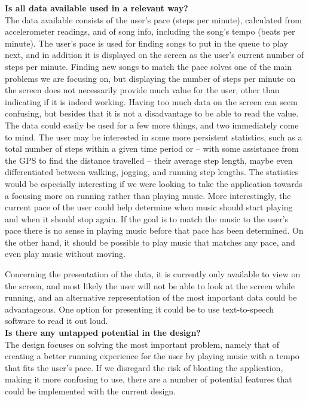 \noindent \textbf{Is all data available used in a relevant way?}\\
The data available consists of the user's pace (steps per minute), calculated from accelerometer readings, and of song info, including the song's tempo (beats per minute).
The user's pace is used for finding songs to put in the queue to play next, and in addition it is displayed on the screen as the user's current number of steps per minute.
Finding new songs to match the pace solves one of the main problems we are focusing on, but displaying the number of steps per minute on the screen does not necessarily provide much value for the user, other than indicating if it is indeed working.
Having too much data on the screen can seem confusing, but besides that it is not a disadvantage to be able to read the value.
The data could easily be used for a few more things, and two immediately come to mind.
The user may be interested in some more persistent statistics, such as a total number of steps within a given time period or -- with some assistance from the GPS to find the distance travelled -- their average step length, maybe even differentiated between walking, jogging, and running step lengths.
The statistics would be especially interesting if we were looking to take the application towards a focusing more on running rather than playing music.
More interestingly, the current pace of the user could help determine when music should start playing and when it should stop again.
If the goal is to match the music to the user's pace there is no sense in playing music before that pace has been determined.
On the other hand, it should be possible to play music that matches any pace, and even play music without moving.

Concerning the presentation of the data, it is currently only available to view on the screen, and most likely the user will not be able to look at the screen while running, and an alternative representation of the most important data could be advantageous.
One option for presenting it could be to use text-to-speech software to read it out loud.\\

\noindent \textbf{Is there any untapped potential in the design?}\\
The design focuses on solving the most important problem, namely that of creating a better running experience for the user by playing music with a tempo that fits the user's pace.
If we disregard the risk of bloating the application, making it more confusing to use, there are a number of potential features that could be implemented with the current design.


